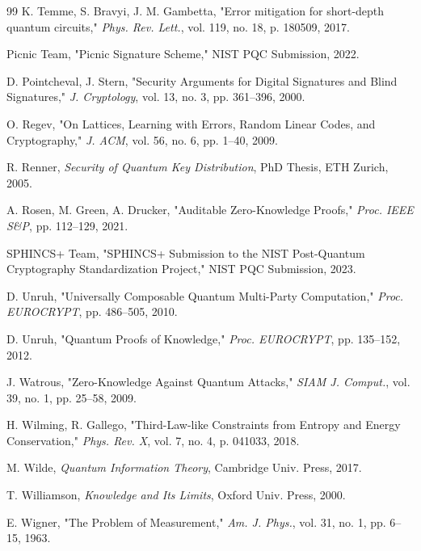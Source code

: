 \documentclass[preprint,12pt]{elsarticle}
\begin{document}
\begin{thebibliography}{99}
                K. Temme, S. Bravyi, J. M. Gambetta, 
                "Error mitigation for short-depth quantum circuits," 
                \textit{Phys. Rev. Lett.}, vol. 119, no. 18, p. 180509, 2017.

                Picnic Team, 
                "Picnic Signature Scheme," 
                NIST PQC Submission, 2022.

                D. Pointcheval, J. Stern, 
                "Security Arguments for Digital Signatures and Blind Signatures," 
                \textit{J. Cryptology}, vol. 13, no. 3, pp. 361–396, 2000.

                O. Regev, 
                "On Lattices, Learning with Errors, Random Linear Codes, and Cryptography," 
                \textit{J. ACM}, vol. 56, no. 6, pp. 1–40, 2009.

                R. Renner, 
                \textit{Security of Quantum Key Distribution}, 
                PhD Thesis, ETH Zurich, 2005.

                A. Rosen, M. Green, A. Drucker, 
                "Auditable Zero-Knowledge Proofs," 
                \textit{Proc. IEEE S\&P}, pp. 112–129, 2021.

                SPHINCS+ Team, 
                "SPHINCS+ Submission to the NIST Post-Quantum Cryptography Standardization Project," 
                NIST PQC Submission, 2023.

                D. Unruh, 
                "Universally Composable Quantum Multi-Party Computation," 
                \textit{Proc. EUROCRYPT}, pp. 486–505, 2010.

                D. Unruh, 
                "Quantum Proofs of Knowledge," 
                \textit{Proc. EUROCRYPT}, pp. 135–152, 2012.

                J. Watrous, 
                "Zero-Knowledge Against Quantum Attacks," 
                \textit{SIAM J. Comput.}, vol. 39, no. 1, pp. 25–58, 2009.

                H. Wilming, R. Gallego, 
                "Third-Law-like Constraints from Entropy and Energy Conservation," 
                \textit{Phys. Rev. X}, vol. 7, no. 4, p. 041033, 2018.

                M. Wilde, 
                \textit{Quantum Information Theory}, 
                Cambridge Univ. Press, 2017.

                T. Williamson, 
                \textit{Knowledge and Its Limits}, 
                Oxford Univ. Press, 2000.

                E. Wigner, 
                "The Problem of Measurement," 
                \textit{Am. J. Phys.}, vol. 31, no. 1, pp. 6–15, 1963.
        \end{thebibliography}
\end{document}
